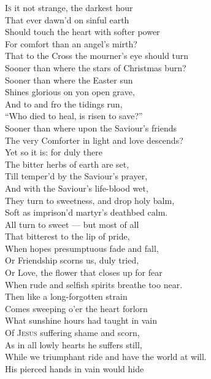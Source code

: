 \textsc{Is} it not strange, the darkest hour \\
 That ever dawn’d on sinful earth \\
 Should touch the heart with softer power \\
 For comfort than an angel’s mirth? \\
 That to the Cross the mourner’s eye should turn \\
 Sooner than where the stars of Christmas burn? \\
  Sooner than where the Easter sun \\
 Shines glorious on yon open grave, \\
 And to and fro the tidings run, \\
 “Who died to heal, is risen to save?” \\
 Sooner than where upon the Saviour’s friends \\
 The very Comforter in light and love descends? \\
  Yet so it is: for duly there \\
 The bitter herbs of earth are set, \\
 Till temper’d by the Saviour’s prayer, \\
 And with the Saviour’s life-blood wet, \\
 They turn to sweetness, and drop holy balm, \\
 Soft as imprison’d martyr’s deathbed calm. \\
  All turn to sweet — but most of all \\
 That bitterest to the lip of pride, \\
 When hopes presumptuous fade and fall, \\
 Or Friendship scorns us, duly tried, \\
 Or Love, the flower that closes up for fear \\
 When rude and selfish spirits breathe too near. \\
  Then like a long-forgotten strain \\
 Comes sweeping o’er the heart forlorn \\
 What sunshine hours had taught in vain \\
 Of \textsc{Jesus} suffering shame and scorn, \\
 As in all lowly hearts he suffers still, \\
 While we triumphant ride and have the world at will. \\
  His pierced hands in vain would hide \\
